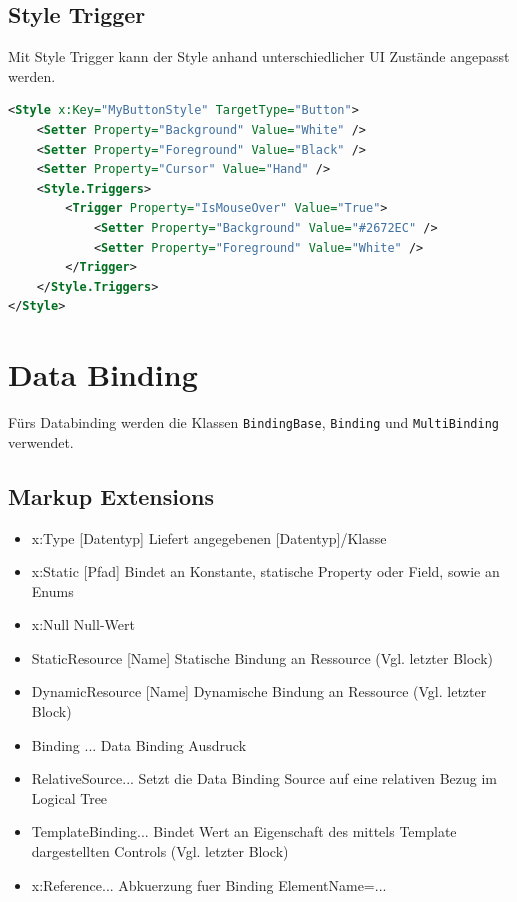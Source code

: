 \subsection{Style Trigger}
Mit Style Trigger kann der Style anhand unterschiedlicher UI Zustände angepasst werden.
\begin{lstlisting}[caption=Eigene Resource Dictionaries, language=XML]
<Style x:Key="MyButtonStyle" TargetType="Button">
	<Setter Property="Background" Value="White" />
	<Setter Property="Foreground" Value="Black" />
	<Setter Property="Cursor" Value="Hand" />
	<Style.Triggers>
		<Trigger Property="IsMouseOver" Value="True">
			<Setter Property="Background" Value="#2672EC" />
			<Setter Property="Foreground" Value="White" />
		</Trigger>
	</Style.Triggers>
</Style>
\end{lstlisting}

\section{Data Binding}
Fürs Databinding werden die Klassen \lstinline|BindingBase|, \lstinline|Binding| und \lstinline|MultiBinding| verwendet.
\subsection{Markup Extensions}
\begin{itemize}
\item {x:Type [Datentyp]} Liefert angegebenen [Datentyp]/Klasse
\item{x:Static [Pfad]} Bindet an Konstante, statische Property oder Field, sowie an Enums
\item{x:Null} Null-Wert
\item{StaticResource [Name]} Statische Bindung an Ressource (Vgl. letzter Block)
\item{DynamicResource [Name]} Dynamische Bindung an Ressource (Vgl. letzter Block)
\item{Binding ...} Data Binding Ausdruck
\item{RelativeSource...} Setzt die Data Binding Source auf eine relativen Bezug im Logical Tree
\item{TemplateBinding...} Bindet Wert an Eigenschaft des mittels Template dargestellten Controls
(Vgl. letzter Block)
\item {x:Reference...} Abkuerzung fuer {Binding ElementName=...}
\end{itemize}

